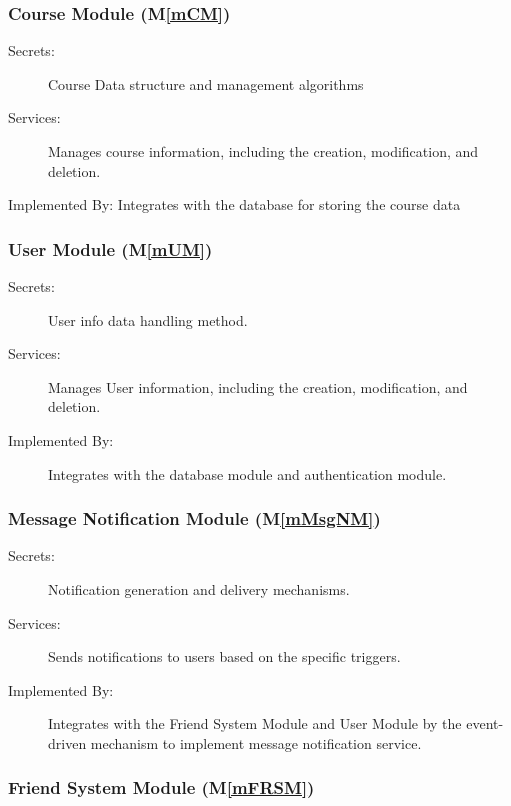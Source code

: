 \documentclass[12pt, titlepage]{article}
\newcommand{\mref}[1]{M\ref{#1}}
\begin{document}
\subsubsection{Course Module (\mref{mCM})}

\begin{description}
\item[Secrets:]Course Data structure and management algorithms
\item[Services:]Manages course information, including the creation, modification, and deletion.
\item[Implemented By: Integrates with the database for storing the course data] 
\end{description}

\subsubsection{User Module (\mref{mUM})}

\begin{description}
\item[Secrets:] User info data handling method.
\item[Services:] Manages User information, including the creation, modification, and deletion.
\item[Implemented By:] Integrates with the database module and authentication module. 
\end{description}

\subsubsection{Message Notification Module (\mref{mMsgNM})}

\begin{description}
\item[Secrets:] Notification generation and delivery mechanisms.
\item[Services: ] Sends notifications to users based on the specific triggers.
\item[Implemented By:] Integrates with the Friend System Module and User Module by the event-driven mechanism to implement message notification service.
\end{description}

\subsubsection{Friend System Module (\mref{mFRSM})}
\end{document}
